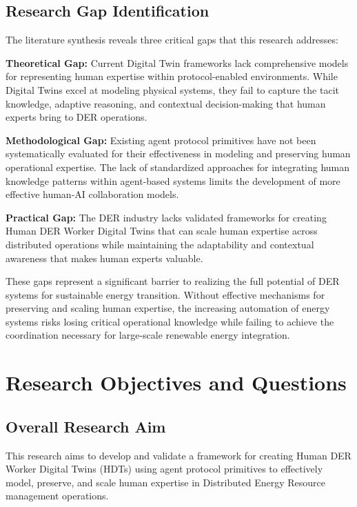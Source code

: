 \documentclass[12pt,a4paper]{article}
\begin{document}
\subsection{Research Gap Identification}

The literature synthesis reveals three critical gaps that this research addresses:

\textbf{Theoretical Gap:} Current Digital Twin frameworks lack comprehensive models for representing human expertise within protocol-enabled environments. While Digital Twins excel at modeling physical systems, they fail to capture the tacit knowledge, adaptive reasoning, and contextual decision-making that human experts bring to DER operations.

\textbf{Methodological Gap:} Existing agent protocol primitives have not been systematically evaluated for their effectiveness in modeling and preserving human operational expertise. The lack of standardized approaches for integrating human knowledge patterns within agent-based systems limits the development of more effective human-AI collaboration models.

\textbf{Practical Gap:} The DER industry lacks validated frameworks for creating Human DER Worker Digital Twins that can scale human expertise across distributed operations while maintaining the adaptability and contextual awareness that makes human experts valuable.

These gaps represent a significant barrier to realizing the full potential of DER systems for sustainable energy transition. Without effective mechanisms for preserving and scaling human expertise, the increasing automation of energy systems risks losing critical operational knowledge while failing to achieve the coordination necessary for large-scale renewable energy integration.

\section{Research Objectives and Questions}
\label{sec:objectives}

\subsection{Overall Research Aim}

This research aims to develop and validate a framework for creating Human DER Worker Digital Twins (HDTs) using agent protocol primitives to effectively model, preserve, and scale human expertise in Distributed Energy Resource management operations.
\end{document}
